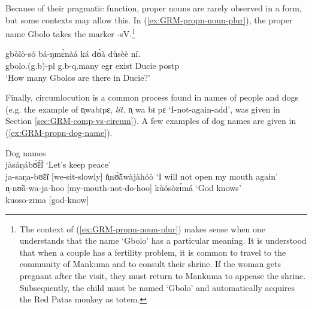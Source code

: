 \begin{exe}
\begin{exe}
\begin{exe}
\begin{exe}
\begin{exe}
\begin{exe}
\begin{exe}
Because of their pragmatic function,  proper nouns  are rarely observed in a  form, but some contexts may allow this. In (\ref{ex:GRM-propn-noun-plur}), the proper name {\sls Gbolo} takes the  marker {\sls -sV}.\footnote{The context of (\ref{ex:GRM-propn-noun-plur}) makes sense when one understands that the name `Gbolo' has a particular meaning.  It is understood that when a couple has a  fertility problem,  it is common to travel to the community of Mankuma and to consult their shrine. If the woman gets pregnant after the visit, they must return to Mankuma to appease the shrine. Subsequently, the child must be named `Gbolo' and automatically acquires the Red Patas monkey as  totem.}


  \begin{exe}
   \ex\label{ex:GRM-propn-noun-plur}
\gll  gbòlò-só bá-ŋmɛ̀nàá ká dʊ̀à dùsèè ní.\\
gbolo.({\sc g.}b)-{\sc pl}  {\sc g.}b-{\sc q}.many {\sc  egr} exist Ducie {\sc
postp}\\
\glt  `How many Gbolos are there in Ducie?' 
 \z

Finally, circumlocution is a common process found in names of people and dogs (e.g. the example of {\sls n̩wabɪpɛ}, {\it lit.}  {\sls n̩ wa bɪ pɛ}  `I-not-again-add', was given in Section \ref{sec:GRM-comp-vs-circum}).   A few examples of dog names are given in (\ref{ex:GRM-propn-dog-name}).

  \ea\label{ex:GRM-propn-dog-name}{\rm Dog names}\\

 \ea\label{ex:GRM-propn-dog-name-1} 
{\sls jàsáŋábʊ̃̀ɛ̃̀ɪ̀} {\rm  `Let's keep peace'}\\
ja-saŋa-bʊ̃ɛ̃ɪ    {\rm [we-sit-slowly]} 
 \ex\label{ex:GRM-propn-dog-name-2} 
{\sls ǹ̩nʊ̃̀ã́wàjàhóò}  {\rm  `I will not open my mouth again'}\\
 n̩-nʊ̃ã-wa-ja-hoo   {\rm [my-mouth-not-do-hoo]}
 \ex\label{ex:GRM-propn-dog-name-3} 
{\sls kùósòzɪ́má}   {\rm `God knows'}\\
kuoso-zɪma  {\rm  [god-know]}

\z 
 \z




\end{exe}
\end{exe}
\end{exe}
\end{exe}
\end{exe}
\end{exe}
\end{exe}
\end{exe}
